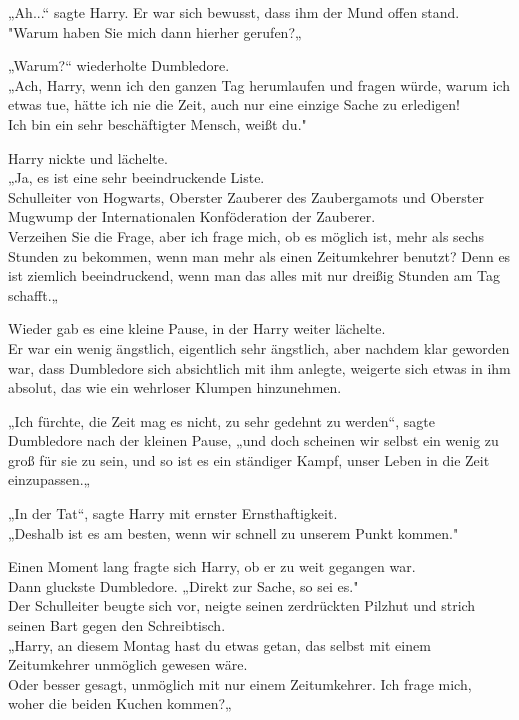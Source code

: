 {„Ah...“ sagte Harry. Er war sich bewusst, dass ihm der Mund offen stand.\\ "Warum haben Sie mich dann hierher gerufen?„

„Warum?“ wiederholte Dumbledore.\\ „Ach, Harry, wenn ich den ganzen Tag herumlaufen und fragen würde, warum ich etwas tue, hätte ich nie die Zeit, auch nur eine einzige Sache zu erledigen!\\ Ich bin ein sehr beschäftigter Mensch, weißt du."

Harry nickte und lächelte.\\ „Ja, es ist eine sehr beeindruckende Liste.\\ Schulleiter von Hogwarts, Oberster Zauberer des Zaubergamots und Oberster Mugwump der Internationalen Konföderation der Zauberer.\\ Verzeihen Sie die Frage, aber ich frage mich, ob es möglich ist, mehr als sechs Stunden zu bekommen, wenn man mehr als einen Zeitumkehrer benutzt? Denn es ist ziemlich beeindruckend, wenn man das alles mit nur dreißig Stunden am Tag schafft.„

Wieder gab es eine kleine Pause, in der Harry weiter lächelte.\\ Er war ein wenig ängstlich, eigentlich sehr ängstlich, aber nachdem klar geworden war, dass Dumbledore sich absichtlich mit ihm anlegte, weigerte sich etwas in ihm absolut, das wie ein wehrloser Klumpen hinzunehmen.

„Ich fürchte, die Zeit mag es nicht, zu sehr gedehnt zu werden“, sagte Dumbledore nach der kleinen Pause, „und doch scheinen wir selbst ein wenig zu groß für sie zu sein, und so ist es ein ständiger Kampf, unser Leben in die Zeit einzupassen.„

„In der Tat“, sagte Harry mit ernster Ernsthaftigkeit.\\ „Deshalb ist es am besten, wenn wir schnell zu unserem Punkt kommen."

Einen Moment lang fragte sich Harry, ob er zu weit gegangen war.\\ Dann gluckste Dumbledore. „Direkt zur Sache, so sei es."\\ Der Schulleiter beugte sich vor, neigte seinen zerdrückten Pilzhut und strich seinen Bart gegen den Schreibtisch.\\ „Harry, an diesem Montag hast du etwas getan, das selbst mit einem Zeitumkehrer unmöglich gewesen wäre.\\ Oder besser gesagt, unmöglich mit nur einem Zeitumkehrer. Ich frage mich, woher die beiden Kuchen kommen?„

}
